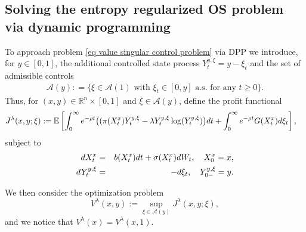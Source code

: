 \documentclass[11pt]{amsart}
\theoremstyle{plain}
\def \dd{{\rm d}}
\def \A{\mathcal{A}}
\numberwithin{equation}{section}
\begin{document}
\subsection{Solving the entropy regularized OS problem via dynamic programming}\label{subsection DPP approach}
To approach  problem \eqref{eq value singular control problem} via DPP we introduce, for $y \in[0,1]$, the additional controlled state process
$ 
Y_{t}^{y,\xi} = y-\xi_{t}
$
and the set of admissible controls 
\begin{eqnarray}\label{eq:admissible_set_y}
    \A(y) : = \{ \xi \in \A(1) \text{ with } \xi_{t} \in[0, y] \text{ a.s.\ for any } t \geq 0\}.
\end{eqnarray}
Thus, for $(x,y) \in \mathbb R ^n \times [0,1]$ and $\xi \in \A (y)$, define the profit functional
$$
\begin{aligned}
J^\lambda (x, y;\xi) & :=  \mathbb{E} \left[ \int_0^{\infty}  e^{- \rho t} \big( ( \pi (X^x_{t} )Y_{t}^{y,\xi}-\lambda Y_{t}^{y,\xi} \log  (Y_{t}^{y,\xi} ) \big) \dd t 
+  \int_0^{\infty}  e^{- \rho t} G(X^x_t) \dd\xi_t \right],
\end{aligned} 
$$
subject to 
\begin{eqnarray}
    \dd X^x_{t} &=&b(X^x_{t}) \dd t+\sigma(X^x_{t}) \dd W_{t}, \quad X^x_{0}=x, \label{eq:x-process}\\
 \dd Y_t^{y,\xi} &=& -\dd\xi_t, \quad Y^{y,\xi}_{0-} =y.\label{eq:y-process}
\end{eqnarray}



We then consider the optimization problem
\begin{equation}\label{eq:singular_value}
    V^\lambda (x, y):=\sup _{\xi \in \A(y)}  J^\lambda (x, y;\xi),
\end{equation}
and we notice that $ V^\lambda (x) = V^\lambda(x, 1)$.
\end{document}
